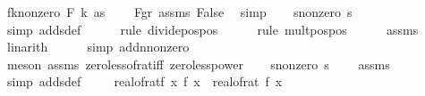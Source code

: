 \begin{isabellebody}
\ fk{\isacharunderscore}{\kern0pt}nonzero{\isacharcolon}{\kern0pt}\ {\isachardoublequoteopen}F\ k\ as\ {\isachargreater}{\kern0pt}\ {}{\isachardoublequoteclose}\ \isamarkupfalse%
\ F{\isacharunderscore}{\kern0pt}gr{\isacharunderscore}{\kern0pt}{}\ assms\ False\ \isamarkupfalse%
\ simp\isanewline
\isanewline
\ \ \isamarkupfalse%
\ s{}{\isacharunderscore}{\kern0pt}nonzero{\isacharcolon}{\kern0pt}\ {\isachardoublequoteopen}s\ {\isachargreater}{\kern0pt}\ {}{\isachardoublequoteclose}\isanewline
\ \ \ \ \isamarkupfalse%
\ {\isacharparenleft}{\kern0pt}simp\ add{\isacharcolon}{\kern0pt}sdef{\isacharparenright}{\kern0pt}\isanewline
\ \ \ \ \isamarkupfalse%
\ {\isacharparenleft}{\kern0pt}rule\ divide{\isacharunderscore}{\kern0pt}pos{\isacharunderscore}{\kern0pt}pos{\isacharparenright}{\kern0pt}\isanewline
\ \ \ \ \isamarkupfalse%
\ {\isacharparenleft}{\kern0pt}rule\ mult{\isacharunderscore}{\kern0pt}pos{\isacharunderscore}{\kern0pt}pos{\isacharparenright}{\kern0pt}\isanewline
\ \ \ \ \isamarkupfalse%
\ assms\ \isamarkupfalse%
\ linarith\isanewline
\ \ \ \ \isamarkupfalse%
\ {\isacharparenleft}{\kern0pt}simp\ add{\isacharcolon}{\kern0pt}n{\isacharunderscore}{\kern0pt}nonzero{\isacharparenright}{\kern0pt}\isanewline
\ \ \ \ \isamarkupfalse%
\ {\isacharparenleft}{\kern0pt}meson\ assms\ zero{\isacharunderscore}{\kern0pt}less{\isacharunderscore}{\kern0pt}of{\isacharunderscore}{\kern0pt}rat{\isacharunderscore}{\kern0pt}iff\ zero{\isacharunderscore}{\kern0pt}less{\isacharunderscore}{\kern0pt}power{\isacharparenright}{\kern0pt}\isanewline
\ \ \isamarkupfalse%
\ s{}{\isacharunderscore}{\kern0pt}nonzero{\isacharcolon}{\kern0pt}\ {\isachardoublequoteopen}s\ {\isachargreater}{\kern0pt}\ {}{\isachardoublequoteclose}\ \isamarkupfalse%
\ assms\ \isamarkupfalse%
\ {\isacharparenleft}{\kern0pt}simp\ add{\isacharcolon}{\kern0pt}sdef{\isacharparenright}{\kern0pt}\ \isanewline
\ \ \isamarkupfalse%
\ real{\isacharunderscore}{\kern0pt}of{\isacharunderscore}{\kern0pt}rat{\isacharunderscore}{\kern0pt}f{\isacharcolon}{\kern0pt}\ {\isachardoublequoteopen}{\isasymAnd}x{\isachardot}{\kern0pt}\ f{\isacharprime}{\kern0pt}\ x\ {\isacharequal}{\kern0pt}\ real{\isacharunderscore}{\kern0pt}of{\isacharunderscore}{\kern0pt}rat\ {\isacharparenleft}{\kern0pt}f\ x{\isacharparenright}{\kern0pt}{\isachardoublequoteclose}\isanewline

\end{isabellebody}
